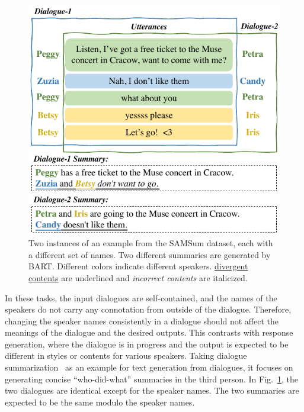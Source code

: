 \begin{figure}[th]
	\centering
	\includegraphics[width=0.9\columnwidth]{example-prev.pdf}
	\caption{Two instances of an example from the SAMSum dataset, each
with a different set of names. Two different summaries are generated by BART. 
Different colors indicate different speakers. \underline{divergent contents} are underlined and \textit{incorrect contents} are italicized.} %
	\label{fig:example}
\end{figure}

In these tasks, the input dialogues are self-contained, and the names of the speakers
do not carry any connotation from outside of the dialogue. 
Therefore,
changing the speaker names consistently in a dialogue should not affect the 
meanings of the dialogue and the desired outputs.
This contrasts with response generation, where the dialogue is in progress and the output is expected to be different in styles or contents for various speakers.
Taking dialogue summarization~\cite{gliwa2019samsum,chen2021dialogsum} as an example for text generation from dialogues, it focuses on
generating concise ``who-did-what'' summaries in the third person.
In Fig.~\ref{fig:example},
the two dialogues are identical except for the speaker names. 
The two summaries are expected to be the same modulo 
the speaker names. 

